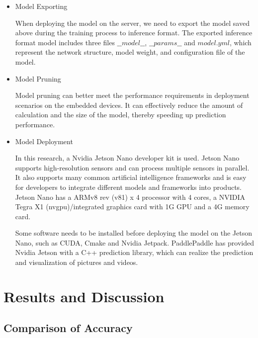 \documentclass[sensors,article,submit,moreauthors,pdftex]{Definitions/mdpi}
\begin{document}
\begin{paracol}{2}
\begin{itemize}
\item{Model Exporting}

When deploying the model on the server, we need to export the model saved above during the training process to inference format. The exported inference format model includes three files $\_\_model\_\_$, $\_\_params\_\_$ and $model.yml$, which represent the network structure, model weight, and configuration file of the model.

\end{itemize}

\begin{itemize}
\item{Model Pruning}

Model pruning can better meet the performance requirements in deployment scenarios on the embedded devices. It can effectively reduce the amount of calculation and the size of the model, thereby speeding up prediction performance.

\end{itemize}

\begin{itemize}
\item{Model Deployment}

In this research, a Nvidia Jetson Nano developer kit is used. Jetson Nano supports high-resolution sensors and can process multiple sensors in parallel. It also supports many common artificial intelligence frameworks and is easy for developers to integrate different models and frameworks into products. Jetson Nano has a ARMv8 rev (v81) x 4 processor with 4 cores, a NVIDIA Tegra X1 (nvgpu)/integrated graphics card with 1G GPU and a 4G memory card.


Some software needs to be installed before deploying the model on the Jetson Nano, such as CUDA, Cmake and Nvidia Jetpack. PaddlePaddle has provided Nvidia Jetson with a C++ prediction library, which can realize the prediction and visualization of pictures and videos.

\end{itemize}


\section{Results and Discussion}

\subsection{Comparison of Accuracy}


\end{paracol}
\end{document}

